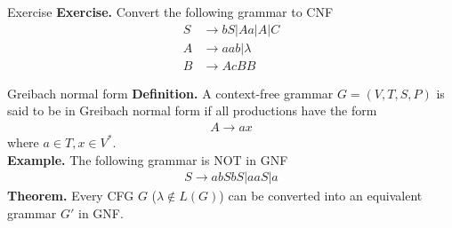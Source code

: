 \documentclass[10pt]{beamer}
\begin{document}
\begin{frame}[t]{Exercise}
    \textbf{Exercise.} Convert the following grammar to CNF
    \begin{align*}
        S & \rightarrow bS | Aa | A | C \\
        A & \rightarrow aab | \lambda   \\
        B & \rightarrow AcBB
    \end{align*}
\end{frame}

\begin{frame}{Greibach normal form}
    \textbf{Definition.} A context-free grammar $G = (V,T,S,P)$ is said to be in Greibach normal form if all productions have the form
    \begin{align*}
        A \rightarrow ax
    \end{align*}
    where $a \in T, x \in V^*$.\\
    \textbf{Example.} The following grammar is NOT in GNF
    \begin{align*}
        S \rightarrow abSbS|aaS|a
    \end{align*}
    \textbf{Theorem.} Every CFG $G$ ($\lambda \notin L(G)$) can be converted into an equivalent grammar $G'$ in GNF.\\
\end{frame}
\end{document}

